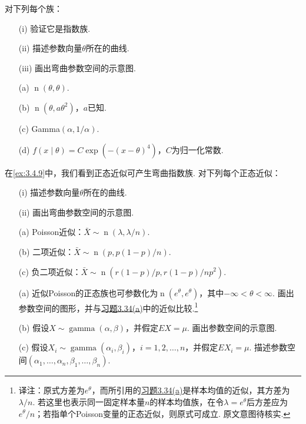 \begin{exercise}\label{exercise:3.33}
对下列每个族：
\begin{enumerate}
\item[(i)] 验证它是指数族.
\item[(ii)] 描述参数向量$\theta$所在的曲线.
\item[(iii)] 画出弯曲参数空间的示意图.
\end{enumerate}
\begin{enumerate}
\item[(a)] $\operatorname n(\theta,\theta)$.
\item[(b)] $\operatorname n(\theta,a\theta^2)$，$a$已知.
\item[(c)] Gamma$(\alpha,1/\alpha)$.
\item[(d)] $f(x\mid\theta)=C\exp(-(x-\theta)^4)$，$C$为归一化常数.
\end{enumerate}
\end{exercise}
\begin{exercise}\label{exercise:3.34}
在\autoref{ex:3.4.9}中，我们看到正态近似可产生弯曲指数族. 对下列每个正态近似：
\begin{enumerate}
\item[(i)] 描述参数向量$\theta$所在的曲线.
\item[(ii)] 画出弯曲参数空间的示意图.
\end{enumerate}
\begin{enumerate}
\item[(a)] Poisson近似：$\bar X\sim\operatorname n(\lambda,\lambda/n)$.
\item[(b)] 二项近似：$\bar X\sim\operatorname n(p,p(1-p)/n)$.
\item[(c)] 负二项近似：$\bar X\sim\operatorname n(r(1-p)/p,r(1-p)/np^2)$.
\end{enumerate}
\end{exercise}
\begin{exercise}\label{exercise:3.35}\leavevmode
\begin{enumerate}
\item[(a)] 近似Poisson的正态族也可参数化为$\operatorname n(e^\theta,e^\theta)$，其中$-\infty<\theta<\infty$. 画出参数空间的图形，并与\hyperref[exercise:3.34]{习题3.34(a)}中的近似比较.\footnote{译注：原式方差为$e^\theta$，而所引用的\hyperref[exercise:3.34]{习题3.34(a)}是样本均值的近似，其方差为$\lambda/n$. 若这里也表示同一固定样本量$n$的样本均值族，在令$\lambda=e^\theta$后方差应为$e^\theta/n$；若指单个Poisson变量的正态近似，则原式可成立. 原文意图待核实.}
\item[(b)] 假设$X\sim\operatorname{gamma}(\alpha,\beta)$，并假定$EX=\mu$. 画出参数空间的示意图.
\item[(c)] 假设$X_i\sim\operatorname{gamma}(\alpha_i,\beta_i)$，$i=1,2,\ldots,n$，并假定$EX_i=\mu$. 描述参数空间$(\alpha_1,\ldots,\alpha_n,\beta_1,\ldots,\beta_n)$.
\end{enumerate}
\end{exercise}
